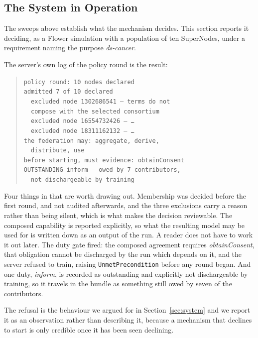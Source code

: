\documentclass[10pt,conference]{IEEEtran}
\begin{document}
\subsection{The System in Operation}

The sweeps above establish what the mechanism decides. This section reports it
deciding, as a Flower simulation with a population of ten SuperNodes, under a
requirement naming the purpose \emph{ds-cancer}.

The server's own log of the policy round is the result:

\begin{quote}\small
\texttt{policy round: 10 nodes declared}\\
\texttt{admitted 7 of 10 declared}\\
\texttt{\ \ excluded node 1302686541 -- terms do not}\\
\texttt{\ \ compose with the selected consortium}\\
\texttt{\ \ excluded node 16554732426 -- \ldots}\\
\texttt{\ \ excluded node 18311162132 -- \ldots}\\
\texttt{the federation may: aggregate, derive,}\\
\texttt{\ \ distribute, use}\\
\texttt{before starting, must evidence: obtainConsent}\\
\texttt{OUTSTANDING inform -- owed by 7 contributors,}\\
\texttt{\ \ not dischargeable by training}
\end{quote}

Four things in that are worth drawing out. Membership was decided before the
first round, and not audited afterwards, and the three exclusions carry a
reason rather than being silent, which is what makes the decision reviewable.
The composed capability is reported explicitly, so what the resulting model may
be used for is written down as an output of the run. A reader does not have to work it
out later. The duty gate fired: the composed agreement requires
\emph{obtainConsent}, that obligation cannot be discharged by the run which
depends on it, and the server refused to train, raising
\texttt{UnmetPrecondition} before any round began. And one duty, \emph{inform},
is recorded as outstanding and explicitly not dischargeable by training, so it
travels in the bundle as something still owed by seven of the contributors.

The refusal is the behaviour we argued for in Section~\ref{sec:system} and we
report it as an observation rather than describing it, because a mechanism that
declines to start is only credible once it has been seen declining.
\end{document}

